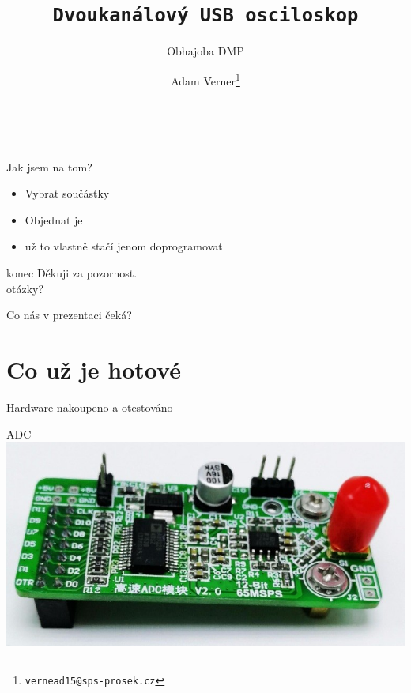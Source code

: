 \documentclass{beamer}
\title{\texttt{\LARGE Dvoukanálový USB osciloskop}}
\subtitle{ Obhajoba DMP }
\author{ Adam Verner\footnote{\texttt{vernead15@sps-prosek.cz}}}
\begin{document}
\begin{frame}
  \maketitle \\
\end{frame}


\begin{frame}{Jak jsem na tom?}
	\begin{itemize}\pause
		\item Vybrat součástky \pause
		\item Objednat je
		\item už to vlastně stačí jenom doprogramovat
	\end{itemize}
\end{frame}

\begin{frame}{konec}
	\Huge Děkuji za pozornost. \\[.35cm]
	\normalsize otázky?
\end{frame}

\begin{frame}{Co nás v prezentaci čeká?}
  \tableofcontents
\end{frame}
	
\section{Co už je hotové}

	\begin{frame}{Hardware}
		nakoupeno a otestováno		
	\end{frame}		
	
	\begin{frame}{ADC}
		\includegraphics[width=\paperwidth]{adc_board.jpg}
	\end{frame}
\end{document}
